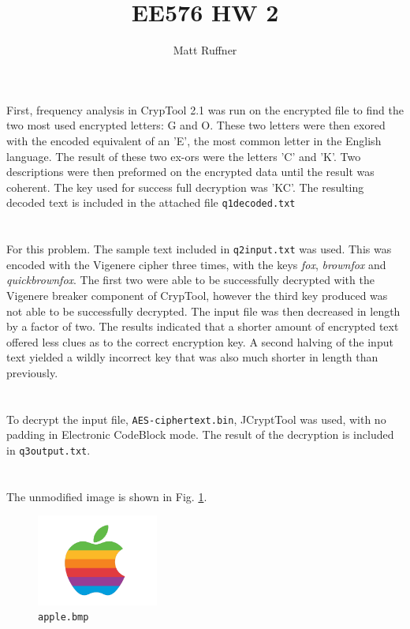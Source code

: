 \documentclass[letterpaper]{article}
\title{EE576 HW 2}
\author{Matt Ruffner}
\begin{document}
\maketitle

\section{}
First, frequency analysis in CrypTool 2.1 was run on the encrypted file to find the two most used encrypted letters: G and O. These two letters were then exored with the encoded equivalent of an 'E', the most common letter in the English language. The result of these two ex-ors were the letters 'C' and 'K'. Two descriptions were then preformed on the encrypted data until the result was coherent. The key used for success full decryption was 'KC'. The resulting decoded text is included in the attached file \texttt{q1decoded.txt}

\section{}
For this problem. The sample text included in \texttt{q2input.txt} was used. This was encoded with the Vigenere cipher three times, with the keys \textit{fox}, \textit{brownfox} and \textit{quickbrownfox}. The first two were able to be successfully decrypted with the Vigenere breaker component of CrypTool, however the third key produced was not able to be successfully decrypted. The input file was then decreased in length by a factor of two. The results indicated that a shorter amount of encrypted text offered less clues as to the correct encryption key. A second halving of the input text yielded  a wildly incorrect key that was also much shorter in length than previously.

\section{}
To decrypt the input file, \texttt{AES-ciphertext.bin}, JCryptTool was used, with no padding in Electronic CodeBlock mode. The result of the decryption is included in \texttt{q3output.txt}.

\section{}


\section{}
The unmodified image is shown in Fig. \ref{fig:apple}.

\begin{figure}
    \centering
    \includegraphics[width=4cm]{apple}
    \caption{\texttt{apple.bmp}}
    \label{fig:apple}
\end{figure}
\end{document}
